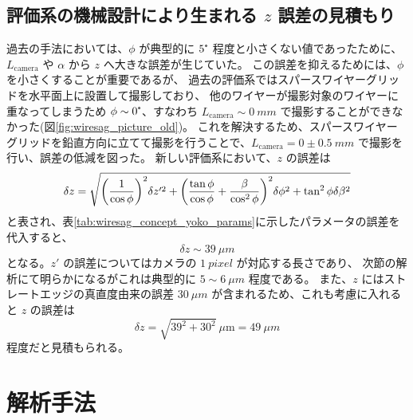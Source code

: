 \documentclass[../../main.tex]{subfiles}
\begin{document}
\subsection{評価系の機械設計により生まれる $z$ 誤差の見積もり}
過去の手法においては、$\phi$ が典型的に $5\tcdegree$ 程度と小さくない値であったために、
$L_{\mathrm{camera}}$ や $\alpha$ から $z$ へ大きな誤差が生じていた\cite{swg:murata}。
この誤差を抑えるためには、$\phi$ を小さくすることが重要であるが、
過去の評価系ではスパースワイヤーグリッドを水平面上に設置して撮影しており、
他のワイヤーが撮影対象のワイヤーに重なってしまうため $\phi\sim 0\tcdegree$、すなわち 
$L_{\mathrm{camera}} \sim \SI{0}{mm}$ で撮影することができなかった(図\ref{fig:wiresag_picture_old})。
これを解決するため、スパースワイヤーグリッドを鉛直方向に立てて撮影を行うことで、$L_{\mathrm{camera}}=0\pm\SI{0.5}{mm}$ で撮影を行い、誤差の低減を図った。
新しい評価系において、$z$ の誤差は
\begin{align}
    \delta z = \sqrt{\qty(\dfrac{1}{\cos\phi})^2\delta z'^2 + \qty(\dfrac{\tan\phi}{\cos\phi}+\dfrac{\beta}{\cos^2\phi})^2\delta\phi^2 + \tan^2\phi\delta\beta^2}
\end{align}
と表され、表\ref{tab:wiresag_concept_yoko_params}に示したパラメータの誤差を代入すると、
\begin{equation}
    \delta z \sim \SI{39}{\mu m}
\end{equation}
となる。$z'$ の誤差についてはカメラの $\SI{1}{pixel}$ が対応する長さであり、
次節の解析にて明らかになるがこれは典型的に $5\sim\SI{6}{\mu m}$ 程度である。
また、$z$ にはストレートエッジの真直度由来の誤差 $\SI{30}{\mu m}$ が含まれるため、これも考慮に入れると $z$ の誤差は
\begin{equation}
    \delta z = \sqrt{39^2+30^2}\ \mu\mathrm{m} = \SI{49}{\mu m}
\end{equation}
程度だと見積もられる。

\section{解析手法}
\end{document}
